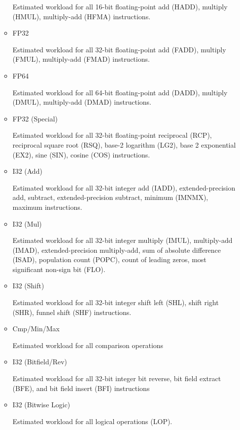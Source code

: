 \documentclass[oneside,openright,12pt,final,en]{mgr}
\begin{document}
\begin{itemize}
\begin{itemize}
		Estimated workload for all 16-bit floating-point add (HADD), multiply (HMUL), multiply-add (HFMA) instructions.
		
		\item FP32 
		
		Estimated workload for all 32-bit floating-point add (FADD), multiply (FMUL), multiply-add (FMAD) instructions.
		
		\item FP64 
		
		Estimated workload for all 64-bit floating-point add (DADD), multiply (DMUL), multiply-add (DMAD) instructions.
		
		\item FP32 (Special) 
		
		Estimated workload for all 32-bit floating-point reciprocal (RCP), reciprocal square root (RSQ), base-2 logarithm (LG2), base 2 exponential (EX2), sine (SIN), cosine (COS) instructions.
		
		\item I32 (Add) 
		
		Estimated workload for all 32-bit integer add (IADD), extended-precision add, subtract, extended-precision subtract, minimum (IMNMX), maximum instructions.
		
		\item I32 (Mul) 
		
		Estimated workload for all 32-bit integer multiply (IMUL), multiply-add (IMAD), extended-precision multiply-add, sum of absolute difference (ISAD), population count (POPC), count of leading zeros, most significant non-sign bit (FLO).
		
		\item I32 (Shift) 
		
		Estimated workload for all 32-bit integer shift left (SHL), shift right (SHR), funnel shift (SHF) instructions.
		
		\item Cmp/Min/Max 
		
		Estimated workload for all comparison operations
		
		\item I32 (Bitfield/Rev) 
		
		Estimated workload for all 32-bit integer bit reverse, bit field extract (BFE), and bit field insert (BFI) instructions
		
		\item I32 (Bitwise Logic) 
		
		Estimated workload for all logical operations (LOP).
		

\end{itemize}
\end{itemize}
\end{document}
